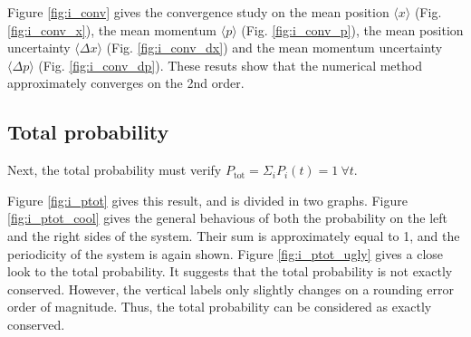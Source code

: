 \documentclass[a4paper,12pt,twoside]{article}
\begin{document}
    Figure \ref{fig:i_conv} gives the convergence study on the mean position $\langle x \rangle$ (Fig. \ref{fig:i_conv_x}), the mean momentum $\langle p \rangle$ (Fig. \ref{fig:i_conv_p}), the mean position uncertainty $\langle \Delta x \rangle$ (Fig. \ref{fig:i_conv_dx}) and the mean momentum uncertainty $\langle \Delta p \rangle$ (Fig. \ref{fig:i_conv_dp}).
    These resuts show that the numerical method approximately converges on the 2nd order.


  \subsection{Total probability}
    Next, the total probability must verify $P_\text{tot} = \Sigma_i P_i(t) = 1~\forall t$.

    Figure \ref{fig:i_ptot} gives this result, and is divided in two graphs.
    Figure \ref{fig:i_ptot_cool} gives the general behavious of both the probability on the left and the right sides of the system.
    Their sum is approximately equal to 1, and the periodicity of the system is again shown.
    Figure \ref{fig:i_ptot_ugly} gives a close look to the total probability.
    It suggests that the total probability is not exactly conserved.
    However, the vertical labels only slightly changes on a rounding error order of magnitude.
    Thus, the total probability can be considered as exactly conserved.
\end{document}
